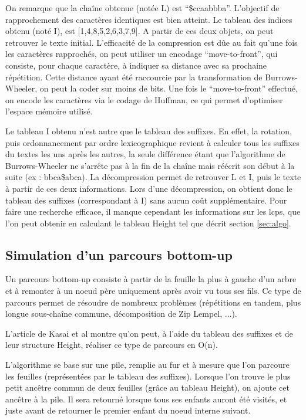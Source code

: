\documentclass[a4paper,10pt]{article}
\begin{document}
On remarque que la chaîne obtenue (notée L) est
``\$ccaabbba''. L'objectif de rapprochement des caractères identiques
est bien atteint. Le tableau des indices obtenu (noté I), est
[1,4,8,5,2,6,3,7,9]. A partir de ces deux objets, on peut retrouver le
texte initial. L'efficacité de la compression est dûe au fait qu'une
fois les caractères rapprochés, on peut utiliser un encodage
``move-to-front'', qui consiste, pour chaque caractère, à indiquer sa
distance avec sa prochaine répétition. Cette distance ayant été
raccourcie par la transformation de Burrows-Wheeler, on peut la coder
sur moins de bits. Une fois le ``move-to-front'' effectué, on encode
les caractères via le codage de Huffman, ce qui permet d'optimiser
l'espace mémoire utilisé.

Le tableau I obtenu n'est autre que le tableau des suffixes. En effet,
la rotation, puis ordonnancement par ordre lexicographique revient à
calculer tous les suffixes du textes les uns après les autres, la
seule différence étant que l'algorithme de Burrows-Wheeler ne s'arrête
pas à la fin de la chaîne mais réécrit son début à la suite (ex :
bbca\$abca). La décompression permet de retrouver L et I, puis le
texte à partir de ces deux informations. Lors d'une décompression, on
obtient donc le tableau des suffixes (correspondant à I) sans aucun
coût supplémentaire. Pour faire une recherche efficace, il manque
cependant les informations sur les lcps, que l'on peut obtenir en
calculant le tableau Height tel que décrit section \ref{sec:algo}.


\subsection{Simulation d'un parcours bottom-up}
\label{sec:bottomup}

Un parcours bottom-up consiste à partir de la feuille la plus à gauche
d'un arbre et à remonter à un noeud père uniquement après avoir vu
tous ses fils. Ce type de parcours permet de résoudre de nombreux
problèmes (répétitions en tandem, plus longue sous-chaîne commune,
décomposition de Zip Lempel, ...)\cite{Abouelhoda200453}.

L'article de Kasai et al montre qu'on peut, à l'aide du tableau des
suffixes et de leur structure Height, réaliser ce type de parcours en
O(n).

L'algorithme se base sur une pile, remplie au fur et à mesure que l'on
parcoure les feuilles (représentées par le tableau des
suffixes). Lorsque l'on trouve le plus petit ancêtre commun de deux
feuilles (grâce au tableau Height), on ajoute cet ancêtre à la
pile. Il sera retourné lorsque tous ses enfants auront été visités, et
juste avant de retourner le premier enfant du noeud interne suivant.
\end{document}
